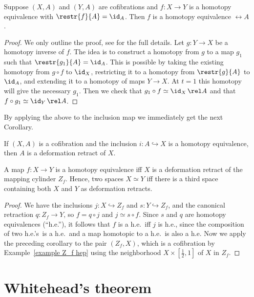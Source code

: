 \begin{prop}
    Suppose $(X,A)$ and $(Y,A)$ are cofibrations and $f:X\to Y$ is a homotopy equivalence with $\restr{f}{A}=\id_A$. Then $f$ is a homotopy equivalence $\rel A$.
\end{prop}
\begin{proof}
    We only outline the proof, see \cite[Prop.~0.19]{Hatcher} for the full details. Let $g:Y\to X$ be a homotopy inverse of $f$. The idea is to construct a homotopy from $g$ to a map $g_1$ such that $\restr{g_1}{A}=\id_A$. This is possible by taking the existing homotopy from $g\circ f$ to $\id_X$, restricting it to a homotopy from $\restr{g}{A}$ to $\id_A$, and extending it to a homotopy of maps $Y\to X$. At $t=1$ this homotopy will give the necessary $g_1$. Then we check that $g_1\circ f\simeq \id_X \,\rel A$ and that $f\circ g_1\simeq \id_Y\,\rel A$.  
\end{proof}
By applying the above to the inclusion map we immediately get the next Corollary.
\begin{cor}
    If $(X,A)$ is a cofibration and the inclusion $i:A\hookrightarrow X$ is a homotopy equivalence, then $A$ is a deformation retract of $X$.
\end{cor}
\begin{cor}\label{cor 0.21 Hatcher}
    A map $f:X\to Y$ is a homotopy equivalence iff $X$ is a deformation retract of the mapping cylinder $Z_f$. Hence, two spaces $X\simeq Y$ iff there is a third space containing both $X$ and $Y$ as deformation retracts.
\end{cor}
\begin{proof}
    We have the inclusions $j:X\hookrightarrow Z_f$ and $s:Y\hookrightarrow Z_f$, and the canonical retraction $q:Z_f\to Y$, so $f=q\circ j$ and $j\simeq s\circ f$. Since $s$ and $q$ are homotopy equivalences (``h.e.''), it follows that $f$ is a h.e.\ iff $j$ is h.e., since the composition of two h.e.'s\ is a h.e.\ and a map homotopic to a h.e.\ is also a h.e. Now we apply the preceding corollary to the pair $(Z_f,X)$, which is a cofibration by Example~\ref{example Z_f hep} using the neighborhood $X\times [\frac12,1]$ of $X$ in $Z_f$.
\end{proof}





\section{Whitehead's theorem}

